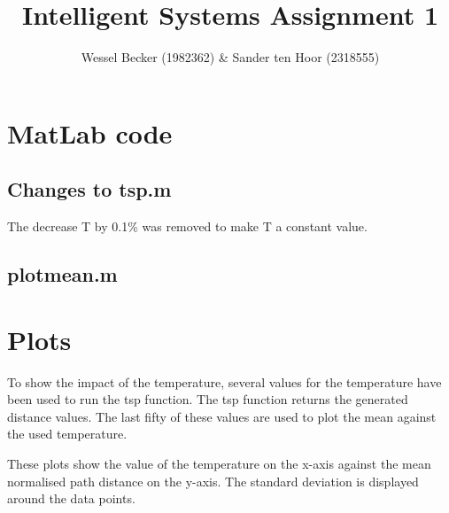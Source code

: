 \documentclass[10pt,a4paper]{article}
\begin{document}
\title{Intelligent Systems Assignment 1}
\author{Wessel Becker (1982362) \& Sander ten Hoor (2318555)}
\maketitle
\section{MatLab code}
\subsection{Changes to tsp.m}
The decrease T by 0.1\% was removed to make T a constant value.


\subsection{plotmean.m}


\section{Plots}
To show the impact of the temperature, several values for the temperature have been used to run the tsp function. The tsp function returns the generated distance values. The last fifty of these values are used to plot the mean against the used temperature.

These plots show the value of the temperature on the x-axis against the mean normalised path distance on the y-axis. The standard deviation is displayed around the data points.

 \\
\end{document}
